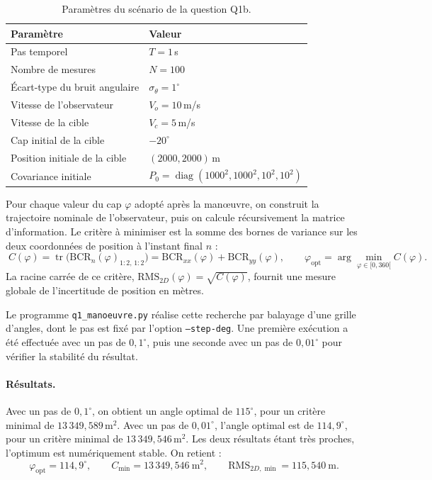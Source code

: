 \documentclass[11pt,a4paper]{article}
\newcommand{\BCR}{\mathrm{BCR}}
\DeclareMathOperator{\diag}{diag}
\theoremstyle{remark}
\begin{document}
\begin{table}[ht]
\centering
\caption{Paramètres du scénario de la question Q1b.}
\label{tab:q1_param}
\begin{tabular}{ll}
\toprule
Paramètre & Valeur \\
\midrule
Pas temporel & $T = 1$\,s \\
Nombre de mesures & $N = 100$ \\
Écart-type du bruit angulaire & $\sigma_\theta = 1^\circ$ \\
Vitesse de l'observateur & $V_o = 10$\,m/s \\
Vitesse de la cible & $V_c = 5$\,m/s \\
Cap initial de la cible & $-20^\circ$ \\
Position initiale de la cible & $(2000, 2000)$\,m \\
Covariance initiale & $P_0 = \diag(1000^2, 1000^2, 10^2, 10^2)$ \\
\bottomrule
\end{tabular}
\end{table}

Pour chaque valeur du cap $\varphi$ adopté après la manœuvre, on construit la trajectoire nominale de l'observateur, puis on calcule récursivement la matrice d'information. Le critère à minimiser est la somme des bornes de variance sur les deux coordonnées de position à l'instant final $n$ :
\begin{equation}
\boxed{\;
C(\varphi) = \operatorname{tr}\big(\BCR_n(\varphi)_{1:2,\,1:2}\big) = \BCR_{xx}(\varphi) + \BCR_{yy}(\varphi),
\qquad
\varphi_{\mathrm{opt}} = \arg\min_{\varphi \in [0, 360[} C(\varphi).
\;}
\end{equation}
La racine carrée de ce critère, $\mathrm{RMS}_{2D}(\varphi) = \sqrt{C(\varphi)}$, fournit une mesure globale de l'incertitude de position en mètres.

Le programme \texttt{q1\_manoeuvre.py} réalise cette recherche par balayage d'une grille d'angles, dont le pas est fixé par l'option \texttt{--step-deg}. Une première exécution a été effectuée avec un pas de $0{,}1^\circ$, puis une seconde avec un pas de $0{,}01^\circ$ pour vérifier la stabilité du résultat.

\paragraph{Résultats.}
Avec un pas de $0{,}1^\circ$, on obtient un angle optimal de $115^\circ$, pour un critère minimal de $13\,349{,}589$\,m$^2$. Avec un pas de $0{,}01^\circ$, l'angle optimal est de $114{,}9^\circ$, pour un critère minimal de $13\,349{,}546$\,m$^2$. Les deux résultats étant très proches, l'optimum est numériquement stable. On retient :
\begin{equation}
\boxed{\;
\varphi_{\mathrm{opt}} = 114{,}9^\circ,
\qquad
C_{\min} = 13\,349{,}546\ \text{m}^2,
\qquad
\mathrm{RMS}_{2D,\min} = 115{,}540\ \text{m}.
\;}
\end{equation}
\end{document}

